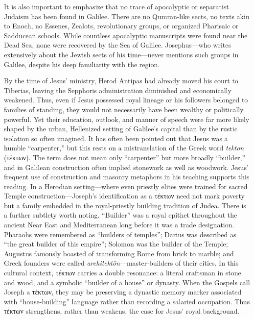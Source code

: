 It is also important to emphasize that no trace of apocalyptic or separatist Judaism has been found in Galilee.
There are no Qumran-like sects, no texts akin to Enoch, no Essenes, Zealots, revolutionary groups, or organized Pharisaic or Sadducean schools.
While countless apocalyptic manuscripts were found near the Dead Sea, none were recovered by the Sea of Galilee.
Josephus---who writes extensively about the Jewish sects of his time---never mentions such groups in Galilee, despite his deep familiarity with the region.

By the time of Jesus’ ministry, Herod Antipas had already moved his court to Tiberias, leaving the Sepphoris administration diminished and economically weakened.
Thus, even if Jesus possessed royal lineage or his followers belonged to families of standing, they would not necessarily have been wealthy or politically powerful.
Yet their education, outlook, and manner of speech were far more likely shaped by the urban, Hellenized setting of Galilee's capital than by the rustic isolation so often imagined.
It has often been pointed out that Jesus was a humble ``carpenter,'' but this rests on a mistranslation of the Greek word \emph{tekton} (τέκτων).
The term does not mean only ``carpenter'' but more broadly ``builder,'' and in Galilean construction often implied stonework as well as woodwork.
Jesus' frequent use of construction and masonry metaphors in his teaching supports this reading.
In a Herodian setting---where even priestly elites were trained for sacred Temple construction---Joseph's identification as a τέκτων need not mark poverty but a family embedded in the royal-priestly building tradition of Judea.
There is a further subtlety worth noting.
``Builder'' was a royal epithet throughout the ancient Near East and Mediterranean long before it was a trade designation.
Pharaohs were remembered as ``builders of temples''; Darius was described as ``the great builder of this empire''; Solomon was the builder of the Temple; Augustus famously boasted of transforming Rome from brick to marble; and Greek founders were called \emph{architektōn}---master-builders of their cities.
In this cultural context, τέκτων carries a double resonance: a literal craftsman in stone and wood, and a symbolic ``builder of a house'' or dynasty.
When the Gospels call Joseph a τέκτων, they may be preserving a dynastic memory marker associated with ``house-building'' language rather than recording a salaried occupation.
Thus τέκτων strengthens, rather than weakens, the case for Jesus' royal background.

